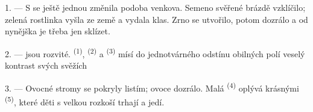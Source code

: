 %
%
%


\VUsaut{5.0mm}
\VUsaut{3.0mm}
\VUsaut{3.0mm}
\VUsaut{4.0mm}
\VUsaut{3.0mm}

1. --- S  se ještě jednou změnila podoba venkova. Semeno svěřené brázdě
vzklíčilo; zelená rostlinka vyšla ze země a vydala klas. Zrno se utvořilo, potom
dozrálo a od nynějška je třeba jen sklízet.

2. ---  jsou rozvité.  \textsuperscript{(1)},
 \textsuperscript{(2)} a 
\textsuperscript{(3)} mísí do jednotvárného odstínu obilných polí veselý kontrast
svých svěžích 

3. --- Ovocné stromy se pokryly listím; ovoce dozrálo. Malá 
\textsuperscript{(4)} oplývá krásnými  \textsuperscript{(5)}, které
děti s velkou rozkoší trhají a jedí.

